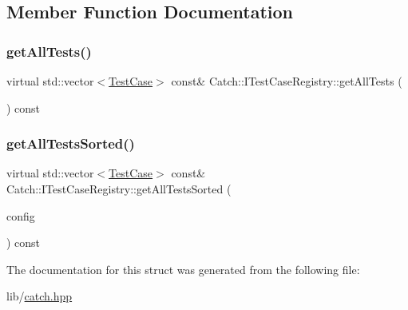 \subsection{Member Function Documentation}
\hypertarget{struct_catch_1_1_i_test_case_registry_ad6e4d4a621655123f73ae98cfeda063d}{}\label{struct_catch_1_1_i_test_case_registry_ad6e4d4a621655123f73ae98cfeda063d} 
\subsubsection{\texorpdfstring{get\+All\+Tests()}{getAllTests()}}
{\footnotesize\ttfamily virtual std\+::vector$<$\hyperlink{class_catch_1_1_test_case}{Test\+Case}$>$ const\& Catch\+::\+I\+Test\+Case\+Registry\+::get\+All\+Tests (\begin{DoxyParamCaption}{ }\end{DoxyParamCaption}) const\hspace{0.3cm}{\ttfamily [pure virtual]}}

\hypertarget{struct_catch_1_1_i_test_case_registry_a33e46639d0319d35497c05bb5d02be5a}{}\label{struct_catch_1_1_i_test_case_registry_a33e46639d0319d35497c05bb5d02be5a} 
\subsubsection{\texorpdfstring{get\+All\+Tests\+Sorted()}{getAllTestsSorted()}}
{\footnotesize\ttfamily virtual std\+::vector$<$\hyperlink{class_catch_1_1_test_case}{Test\+Case}$>$ const\& Catch\+::\+I\+Test\+Case\+Registry\+::get\+All\+Tests\+Sorted (\begin{DoxyParamCaption}\item[{I\+Config const \&}]{config }\end{DoxyParamCaption}) const\hspace{0.3cm}{\ttfamily [pure virtual]}}



The documentation for this struct was generated from the following file\+:\begin{DoxyCompactItemize}
\item 
lib/\hyperlink{catch_8hpp}{catch.\+hpp}\end{DoxyCompactItemize}
